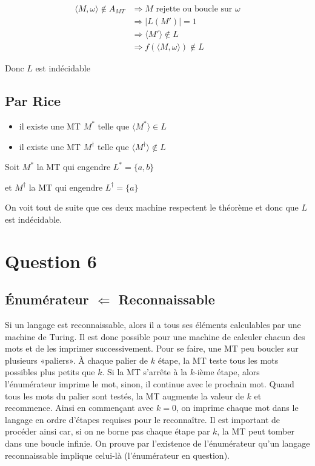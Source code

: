 \documentclass{article}
\newcommand\bk[1]{\langle #1 \rangle}
\begin{document}
\begin{align*}
  \bk{M, \omega} \notin A_{MT} &\Rightarrow M \text{ rejette ou boucle sur } \omega\\
  &\Rightarrow |L(M')| = 1\\
  &\Rightarrow \bk{M'} \notin L\\
  &\Rightarrow f(\bk{M, \omega}) \notin L
\end{align*}

Donc $L$ est indécidable
\subsection{Par Rice}
\begin{itemize}
\item il existe une MT $M^*$ telle que $\bk{M^*} \in L$
\item il existe une MT $M^\dag$ telle que $\bk{M^\dag} \notin L$
\end{itemize}

\vspace{1cm}

Soit $M^*$ la MT qui engendre $L^*=\{a, b\}$

et $M^\dag$ la MT qui engendre $L^\dag=\{a\}$

On voit tout de suite que ces deux machine respectent le théorème et donc que $L$ est indécidable.

\pagebreak

\section{Question 6}
\subsection{Énumérateur $\Leftarrow$ Reconnaissable}
Si un langage est reconnaissable, alors il a tous ses éléments calculables par une machine de Turing. Il est donc possible pour une machine de calculer chacun des mots et de les imprimer successivement. Pour se faire, une MT peu boucler sur plusieurs «paliers». À chaque palier de $k$ étape, la MT teste tous les mots possibles plus petits que $k$. Si la MT s'arrête à la $k$-ième étape, alors l'énumérateur imprime le mot, sinon, il continue avec le prochain mot. Quand tous les mots du palier sont testés, la MT augmente la valeur de $k$ et recommence. Ainsi en commençant avec $k=0$, on imprime chaque mot dans le langage en ordre d'étapes requises pour le reconnaître. Il est important de procéder ainsi car, si on ne borne pas chaque étape par $k$, la MT peut tomber dans une boucle infinie. On prouve par l'existence de l'énumérateur qu'un langage reconnaissable implique celui-là (l'énumérateur en question).
\end{document}
